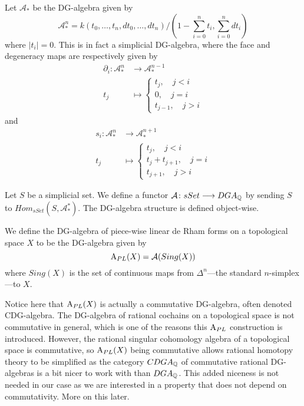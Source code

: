 \begin{definition}
Let $\mathcal{A}_*$ be the DG-algebra given by 
\begin{equation*}
    \mathcal{A}^n_* = k(t_0, \ldots, t_n, dt_0, \ldots, dt_n)/(1-\sum_{i=0}^n t_i, \sum_{i=0}^n dt_i) 
\end{equation*}
where $|t_i|=0$. This is in fact a simplicial DG-algebra, where the face and degeneracy maps are respectively given by 
\begin{align*}
    \partial_i\colon \mathcal{A}_*^n &\longrightarrow\mathcal{A}_*^{n-1} \\
    t_j&\longmapsto
    \begin{cases}
        t_j, \quad j<i \\
        0, \quad j=i \\
        t_{j-1}, \quad j>i
    \end{cases}
\end{align*}
and 
\begin{align*}
    s_i\colon \mathcal{A}_*^n &\longrightarrow\mathcal{A}_*^{n+1} \\
    t_j&\longmapsto
    \begin{cases}
        t_j, \quad j<i \\
        t_j+t_{j+1}, \quad j=i \\
        t_{j+1}, \quad j>i
    \end{cases}
\end{align*}
\end{definition}

\begin{definition}
Let $S$ be a simplicial set. We define a functor $\mathcal{A}\colon sSet\longrightarrow DGA_{\mathbb{Q}}$ by sending $S$ to $Hom_{sSet}(S, \mathcal{A}_*^*)$. The DG-algebra structure is defined object-wise.
\end{definition}


\begin{example}
We define the DG-algebra of piece-wise linear de Rham forms on a topological space $X$ to be the DG-algebra given by
\begin{equation*}
    \text{A}_{PL}(X) = \mathcal{A}(Sing(X))
\end{equation*}
where $Sing(X)$ is the set of continuous maps from $\Delta^n$---the standard $n$-simplex---to $X$. 
\end{example}

Notice here that $\text{A}_{PL}(X)$ is actually a commutative DG-algebra, often denoted CDG-algebra. The DG-algebra of rational cochains on a topological space is not commutative in general, which is one of the reasons this $\text{A}_{PL}$ construction is introduced. However, the rational singular cohomology algebra of a topological space is commutative, so $\text{A}_{PL}(X)$ being commutative allows rational homotopy theory to be simplified as the category $CDGA_{\mathbb{Q}}$ of commutative rational DG-algebras is a bit nicer to work with than $DGA_{\mathbb{Q}}$. This added niceness is not needed in our case as we are interested in a property that does not depend on commutativity. More on this later. 




